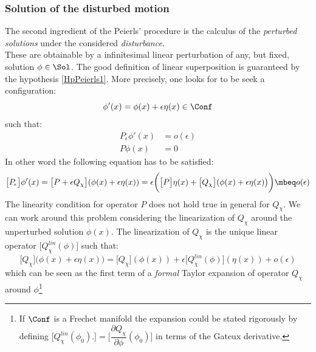 \documentclass[Main]{subfiles}
\begin{document}
	\subsubsection{Solution of the disturbed motion}
		The second ingredient of the Peierls' procedure is the calculus of the \emph{perturbed solutions} under the considered \emph{disturbance}.
		\\
		These are obtainable by a infinitesimal linear perturbation of any, but fixed, solution $\phi \in \Sol$. The good definition of linear superposition is guaranteed by the hypothesis \ref{HpPeierls1}.
		More precisely, one looks for to be seek a configuration:
			\begin{displaymath}
					\phi'(x) = \phi(x) + \epsilon \eta(x) \in \Conf
			\end{displaymath}
		such that:
			\begin{align*} 
				P_\epsilon \phi'(x) &= o(\epsilon)  \\ 
				P \phi(x) &= 0
			\end{align*}
		In other word the following equation has to be satisfied:
		\begin{displaymath}
			\big[P_\epsilon\big] \phi'(x) = \big[ P + \epsilon Q_\chi		\big]( \phi(x) + \epsilon \eta(x)) 
			= \epsilon \biggr( \big[P\big] \eta(x) + \big[Q_\chi \big]( \phi(x) + \epsilon \eta(x)\big)\biggr) \mbeq o(\epsilon)			
		\end{displaymath}
		The linearity condition for operator $P$ does not hold true in general for $Q_\chi$.
		We can work around this problem considering the linearization\cite[pag. 31]{Khavkine2014} of $Q_\chi$ around the unperturbed solution $\phi(x)$. 
		The linearization of $Q_\chi$ is the unique linear operator $\big[Q_\chi^{lin}(\phi) \big]$ such that:
		\begin{displaymath}
			\big[Q_\chi \big]( \phi(x) + \epsilon \eta(x)\big)= \big[Q_\chi \big]( \phi(x)) + \epsilon \big[Q_\chi^{lin}(\phi)  \big]( \eta(x)) + o(\epsilon)
		\end{displaymath}
		which can be seen as the first term of a \emph{formal} Taylor expansion of operator $Q_\chi$ around $\phi$\footnote{If $\Conf$ is a Frechet manifold the expansion could be stated rigorously by defining $\big[Q_\chi^{lin}(\phi_0) . \big] = \big[\dfrac{\partial Q_\chi}{\partial \phi} (\phi_0)\big] $ in terms of the Gateux derivative.}
\end{document}
